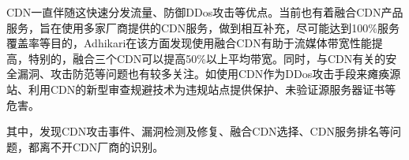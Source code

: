 CDN一直伴随这快速分发流量、防御DDos攻击等优点。当前也有着融合CDN产品服务，旨在使用多家厂商提供的CDN服务\cite{Zhu2021}，做到相互补充，尽可能达到100\%服务覆盖率等目的，Adhikari\cite{Adhikari2014}在该方面发现使用融合CDN有助于流媒体带宽性能提高，特别的，融合三个CDN可以提高50\%以上平均带宽。同时，与CDN有关的安全漏洞、攻击防范等问题也有较多关注。如使用CDN作为DDos攻击手段\cite{Guo2020}来瘫痪源站、利用CDN的新型审查规避技术\cite{Wei2021}为违规站点提供保护、未验证源服务器证书\cite{SHOBIRI2021}等危害。

其中，发现CDN攻击事件、漏洞检测及修复、融合CDN选择、CDN服务排名等问题，都离不开CDN厂商的识别。


